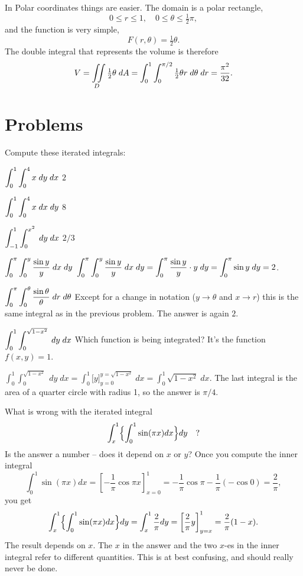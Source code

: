 In Polar coordinates things are easier.  The domain is a polar rectangle, 
\[
0\le r\le 1, \quad 0\le \theta \le \tfrac12\pi,
\]
and the function is very simple,
\[
F(r, \theta) = \tfrac12 \theta.
\]
The double integral that represents the volume is therefore
\begin{equation*}
  V  = \iint\limits_D \tfrac12\theta \; dA 
  = \int_0^1 \int_0^{\pi/2} \tfrac12 \theta r\; d\theta\; dr 
  = \frac{\pi^2}{32}.
\end{equation*}


\section{Problems} 

\problemfont\noindent
\begin{minipage}{0.44\textwidth}
\problem Compute these iterated integrals: 

\subprob $\displaystyle \int_0^1 \int_0^4 x\;  dy\;  dx$ 
\answer %
$2$
\endanswer

\subprob $\displaystyle \int_0^1 \int_0^4 x \; dx\;  dy$ 
\answer %
$8$
\endanswer 

\subprob $\displaystyle \int_{-1}^1 \int_0^{x^2} \; dy \; dx$ 
\answer
$2/3$
\endanswer
\end{minipage}\hfill
\begin{minipage}{0.44\textwidth}
\subprob $\displaystyle \int_0^\pi \int _0^y \frac{\sin y}{y}\; dx\; dy$ 
\answer
$\displaystyle \int_0^\pi \int _0^y \frac{\sin y}{y}\; dx\; dy
=
\int_0^\pi \frac{\sin y}{y} \cdot y \; dy = \int_0^\pi \sin y \; dy =
2$.
\endanswer

\subprob $\displaystyle \int_0^\pi \int _0^\theta \frac{\sin \theta}{\theta}\;dr\; d\theta$ 
\answer
Except for a change in notation ($y\to\theta$ and $x\to r$) this is
the same integral as in the previous problem.  The answer is again $2$.
\endanswer

\subprob $\displaystyle \int_0^1 \int _0^{\sqrt{1-x^2}}\; dy\; dx$ 
\answer
Which function is being integrated?  It's the function $f(x, y) = 1$.

\noindent
$\int_0^1 \int _0^{\sqrt{1-x^2}}\; dy\; dx
=\int_0^1 \bigl[y\bigr]_{y=0}^{y=\sqrt{1-x^2}}\; dx
= \int_0^1 \sqrt{1-x^2}\; dx$.
The last integral
is the area of a quarter circle with radius 1, so the answer is $\pi/4$.
\endanswer
\end{minipage}

\problem What is wrong with the iterated integral 
\[
\int_x^1 \Bigl\{\int_0^1 \sin(\pi x) dx \Bigr\}dy\quad ?
\] 
Is the answer a number -- does it depend on $x$ or $y$?
\answer
Once you compute the inner integral
\[
\int_0^1 \sin(\pi x) dx  = \left[ -\frac1\pi\cos\pi x \right]_{x=0}^1
=-\frac1\pi\cos \pi - \frac1\pi (-\cos 0) = \frac 2\pi,
\]
you get 
\[
\int_x^1 \Bigl\{\int_0^1 \sin(\pi x) dx \Bigr\}dy
=\int_x^1 \frac 2\pi dy = \left[ \frac 2\pi y \right]_{y=x}^1 = \frac 2\pi (1-x).
\]
The result depends on $x$.  The $x$ in the answer and the two $x$-es
in the inner integral refer to different quantities.  This is at best
confusing, and should really never be done.
\endanswer

